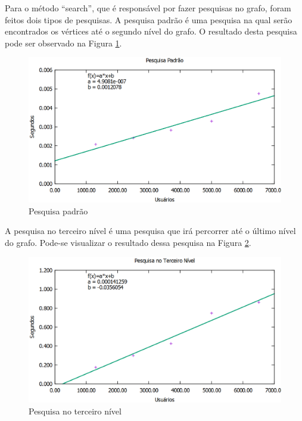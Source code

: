 Para o método ``search'', que é responsável por fazer pesquisas no grafo, foram feitos dois tipos de pesquisas. A pesquisa padrão é uma pesquisa na qual serão encontrados os vértices até o segundo nível do grafo. O resultado desta pesquisa pode ser observado na Figura \ref{pesquisa_padrao}.

\begin{figure}[!h]
	\centering
	\includegraphics[scale=0.55]{figuras/resultados/graficos/pesquisa_padrao.eps}
	\caption[Pesquisa Padrão]{Pesquisa padrão}
	\label{pesquisa_padrao}
\end{figure}

A pesquisa no terceiro nível é uma pesquisa que irá percorrer até o último nível do grafo. Pode-se visualizar o resultado dessa pesquisa na Figura \ref{pesquisa_3}.

\newpage

\begin{figure}[!h]
	\centering
	\includegraphics[scale=0.55]{figuras/resultados/graficos/pesquisa_3_nivel.eps}
	\caption[Pesquisa no terceiro nível]{Pesquisa no terceiro nível}
	\label{pesquisa_3}
\end{figure}

